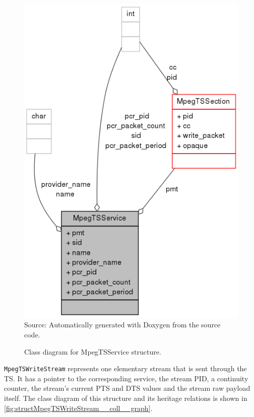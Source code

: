\documentclass[
	12pt,				%
	openright,			%
	twoside,			%
	a4paper,			%
	brazil,
	french,				%
	english
	]{abntex2}
\begin{document}
\begin{figure}[!b]
\centering
\caption{Class diagram for MpegTSService structure.}
\includegraphics[width=0.8\linewidth]{figuras/structMpegTSService__coll__graph.png}
\\Source: Automatically generated with Doxygen from the source code.
\label{fig:structMpegTSService__coll__graph}
\end{figure}

\texttt{MpegTSWriteStream} represents one elementary stream that is sent through the TS. It has a pointer to the corresponding service, the stream PID, a continuity counter, the stream's current PTS and DTS values and the stream raw payload itself. The class diagram of this structure and its heritage relations is shown in \autoref{fig:structMpegTSWriteStream__coll__graph}.
\end{document}
